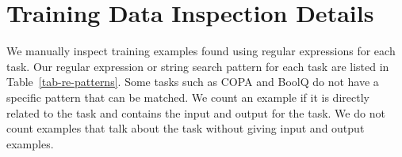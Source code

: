 \documentclass[letterpaper]{article} %
\begin{document}

\section{Training Data Inspection Details}
\label{app:inspection}
We manually inspect training examples found using regular expressions for each task. Our regular expression or string search pattern for each task are listed in Table~\ref{tab-re-patterns}. Some tasks such as COPA and BoolQ do not have a specific pattern that can be matched. We count an example if it is directly related to the task and contains the input and output for the task.  We do not count examples that talk about the task without giving input and output examples.
\end{document}
